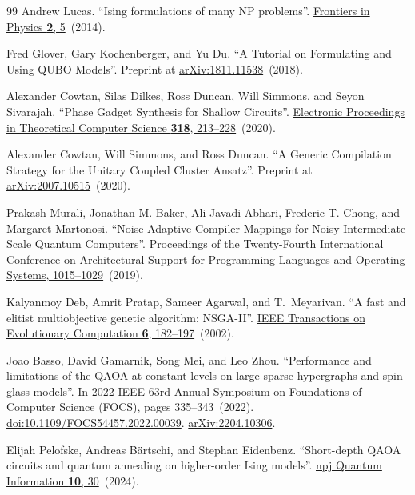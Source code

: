 \documentclass[a4paper,onecolumn,11pt,unpublished]{quantumarticle}
\theoremstyle{remark}
\begin{document}
\begin{thebibliography}{99}
Andrew Lucas.
\newblock ``Ising formulations of many NP problems''.
\newblock \href{https://doi.org/10.3389/fphy.2014.00005}{Frontiers in Physics {\bf 2}, 5}~(2014).

Fred Glover, Gary Kochenberger, and Yu Du.
\newblock ``A Tutorial on Formulating and Using QUBO Models''.
\newblock Preprint at \href{https://arxiv.org/abs/1811.11538}{arXiv:1811.11538}~(2018).

Alexander Cowtan, Silas Dilkes, Ross Duncan, Will Simmons, and Seyon Sivarajah.
\newblock ``Phase Gadget Synthesis for Shallow Circuits''.
\newblock \href{https://doi.org/10.4204/eptcs.318.13}{Electronic Proceedings in Theoretical Computer Science {\bf 318}, 213--228}~(2020).

Alexander Cowtan, Will Simmons, and Ross Duncan.
\newblock ``A Generic Compilation Strategy for the Unitary Coupled Cluster Ansatz''.
\newblock Preprint at \href{https://arxiv.org/abs/2007.10515}{arXiv:2007.10515}~(2020).

Prakash Murali, Jonathan M. Baker, Ali Javadi-Abhari, Frederic T. Chong, and Margaret Martonosi.
\newblock ``Noise-Adaptive Compiler Mappings for Noisy Intermediate-Scale Quantum Computers''.
\newblock \href{https://doi.org/10.1145/3297858.3304075}{Proceedings of the Twenty-Fourth International Conference on Architectural Support for Programming Languages and Operating Systems, 1015--1029}~(2019).

Kalyanmoy Deb, Amrit Pratap, Sameer Agarwal, and T.~Meyarivan.
\newblock ``A fast and elitist multiobjective genetic algorithm: NSGA-II''.
\newblock \href{https://dx.doi.org/10.1109/4235.996017}{IEEE Transactions on Evolutionary Computation {\bf 6}, 182--197}~(2002).

Joao Basso, David Gamarnik, Song Mei, and Leo Zhou.
\newblock ``Performance and limitations of the QAOA at constant levels on large sparse hypergraphs and spin glass models''.
\newblock In 2022 IEEE 63rd Annual Symposium on Foundations of Computer Science (FOCS), pages 335--343~(2022).
\newblock \href{https://dx.doi.org/10.1109/FOCS54457.2022.00039}{doi:10.1109/FOCS54457.2022.00039}.
\newblock \href{http://arxiv.org/abs/2204.10306}{arXiv:2204.10306}.

Elijah Pelofske, Andreas B{\"a}rtschi, and Stephan Eidenbenz.
\newblock ``Short-depth QAOA circuits and quantum annealing on higher-order Ising models''.
\newblock \href{https://dx.doi.org/10.1038/s41534-024-00825-w}{npj Quantum Information {\bf 10}, 30}~(2024).


\end{thebibliography}
\end{document}
